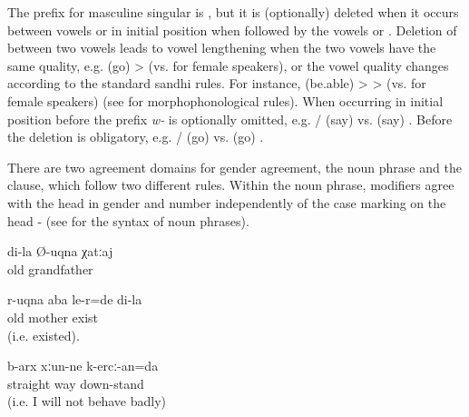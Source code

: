 The prefix for masculine singular is , but it is (optionally) deleted when it occurs between vowels or in initial position when followed by the vowels  or . Deletion of  between two vowels leads to vowel lengthening when the two vowels have the same quality, e.g.  (go) >   (vs.  for female speakers), or the vowel quality changes according to the standard sandhi rules. For instance,  (be.able) >  >   (vs.  for female speakers) (see  for morphophonological rules). When occurring in initial position before  the prefix \textit{w-} is optionally omitted, e.g.  /  (say) vs.  (say) . Before  the deletion is obligatory, e.g.  /  (go) vs.  (go) .

There are two agreement domains for gender agreement, the noun phrase and the clause, which follow two different rules. Within the noun phrase, modifiers agree with the head in gender and number independently of the case marking on the head -  (see  for the syntax of noun phrases).
%
\begin{exe}
	\ex	\label{ex:agreement number}
	\begin{xlist}
		\TabPositions{13em}
		\ex	{} 	\tab	{} 	\label{ex:agreement number@A}
		\ex	{} 	\tab	{} 	\label{ex:agreement number@B}
		\ex	{} 		\tab	{} 		\label{ex:agreement number@C}
	\end{xlist}

	\ex	\label{ex:my old grandfather agreement}
	\gll	di-la	Ø-uqna	χatːaj\\
			old	grandfather\\
	\glt	{}

	\ex	\label{ex:‎‎My old mother was alive agreement}
	\gll	r-uqna	aba	le-r=de	di-la\\
		old	mother	exist	\\
	\glt	{} (i.e. existed).

	\ex	\label{ex:I will be on the straight road agreement}
	\gll	b-arx	xːun-ne	k-ercː-an=da\\
		straight	way	down-stand\\
	\glt	{} (i.e. I will not behave badly)
\end{exe}

